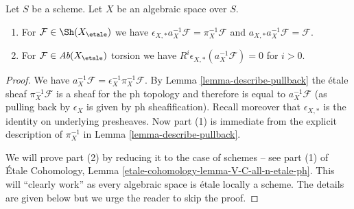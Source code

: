 \begin{lemma}
\label{lemma-comparison-ph-etale}
Let $S$ be a scheme. Let $X$ be an algebraic space over $S$.
\begin{enumerate}
\item For $\mathcal{F} \in \Sh(X_\etale)$ we have
$\epsilon_{X, *}a_X^{-1}\mathcal{F} = \pi_X^{-1}\mathcal{F}$
and $a_{X, *}a_X^{-1}\mathcal{F} = \mathcal{F}$.
\item For $\mathcal{F} \in \textit{Ab}(X_\etale)$ torsion we have
$R^i\epsilon_{X, *}(a_X^{-1}\mathcal{F}) = 0$ for $i > 0$.
\end{enumerate}
\end{lemma}

\begin{proof}
We have $a_X^{-1}\mathcal{F} = \epsilon_X^{-1} \pi_X^{-1}\mathcal{F}$.
By Lemma \ref{lemma-describe-pullback} the \'etale sheaf
$\pi_X^{-1}\mathcal{F}$ is a sheaf for the ph topology
and therefore is equal to $a_X^{-1}\mathcal{F}$ (as pulling
back by $\epsilon_X$ is given by ph sheafification).
Recall moreover that $\epsilon_{X, *}$ is the identity
on underlying presheaves.
Now part (1) is immediate from the explicit description of $\pi_X^{-1}$
in Lemma \ref{lemma-describe-pullback}.

\medskip\noindent
We will prove part (2) by reducing it to the case of schemes --
see part (1) of
\'Etale Cohomology, Lemma \ref{etale-cohomology-lemma-V-C-all-n-etale-ph}.
This will ``clearly work'' as every algebraic space is
\'etale locally a scheme. The details are given below but we urge
the reader to skip the proof.


\end{proof}
